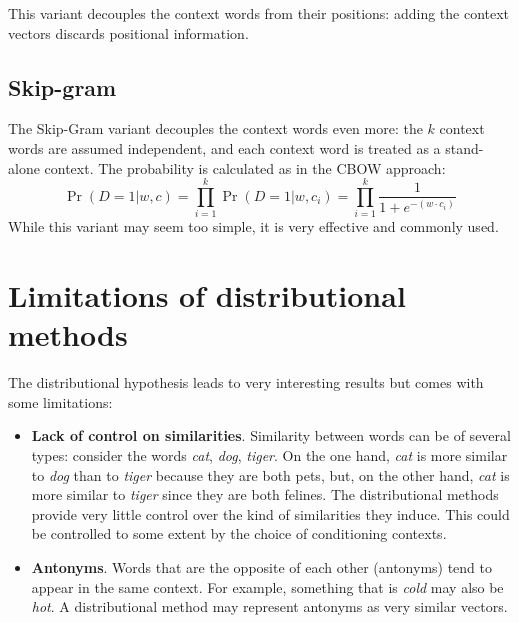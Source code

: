 This variant decouples the context words from their positions: adding the context vectors discards positional information.

\subsection{Skip-gram}
The Skip-Gram variant decouples the context words even more: the $k$ context words are assumed independent, and each context word is treated as a stand-alone context. The probability is calculated as in the CBOW approach:
\[
\Pr(D=1|w,c)=\prod_{i=1}^{k}\Pr(D=1|w,c_{i})=\prod_{i=1}^{k} \frac{1}{1+e^{-(w\cdot c_{i})}}
\]
While this variant may seem too simple, it is very effective and commonly used.

\section{Limitations of distributional methods}
The distributional hypothesis leads to very interesting results but comes with some limitations:
\begin{itemize}
    \item \textbf{Lack of control on similarities}. Similarity between words can be of several types: consider the words \textit{cat}, \textit{dog}, \textit{tiger}. On the one hand, \textit{cat} is more similar to \textit{dog} than to \textit{tiger} because they are both pets, but, on the other hand, \textit{cat} is more similar to \textit{tiger} since they are both felines. The distributional methods provide very little control over the kind of similarities they induce. This could be controlled to some extent by the choice of conditioning contexts.
    \item \textbf{Antonyms}. Words that are the opposite of each other (antonyms) tend to appear in the same context. For example, something that is \textit{cold} may also be \textit{hot}. A distributional method may represent antonyms as very similar vectors.
\end{itemize}

